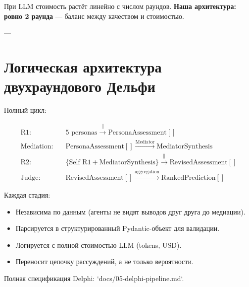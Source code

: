 При LLM стоимость растёт линейно с числом раундов. \textbf{Наша архитектура: ровно 2 раунда} — баланс между качеством и стоимостью.

---


\section{Логическая архитектура двухраундового Дельфи}

Полный цикл:

\begin{equation}
\begin{aligned}
    \text{R1:} \quad &\text{5 personas} \xrightarrow{\parallel} \text{PersonaAssessment}[] \\
    \text{Mediation:} \quad &\text{PersonaAssessment}[] \xrightarrow{\text{Mediator}} \text{MediatorSynthesis} \\
    \text{R2:} \quad &\{\text{Self R1} + \text{MediatorSynthesis}\} \xrightarrow{\parallel} \text{RevisedAssessment}[] \\
    \text{Judge:} \quad &\text{RevisedAssessment}[] \xrightarrow{\text{aggregation}} \text{RankedPrediction}[]
\end{aligned}
\end{equation}

Каждая стадия:
\begin{itemize}
    \item Независима по данным (агенты не видят выводов друг друга до медиации).
    \item Парсируется в структурированный Pydantic-объект для валидации.
    \item Логируется с полной стоимостью LLM (tokens, USD).
    \item Переносит цепочку рассуждений, а не только вероятности.
\end{itemize}

Полная спецификация Delphi: `docs/05-delphi-pipeline.md`.

